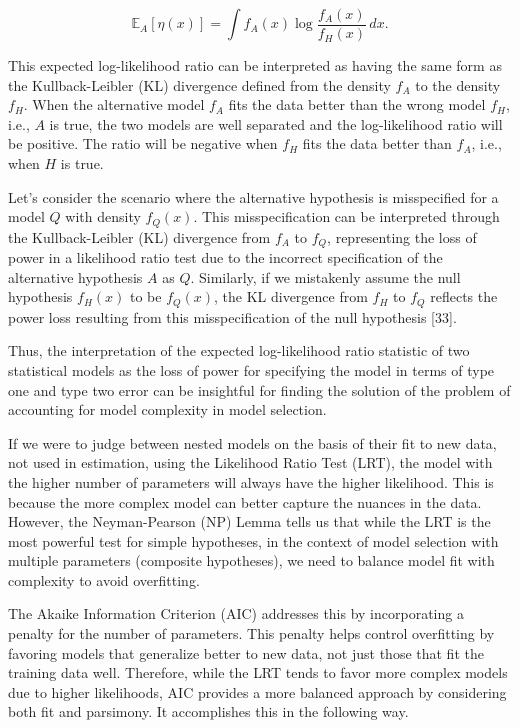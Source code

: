 \documentclass[
11pt, %
oneside, %
english, %
singlespacing, %
]{macthesis} %
\begin{document}
\[
\mathbb{E}_A[\eta(x)]= \int f_A(x) \log \frac{f_A(x)}{f_H(x)} \, dx.
\]

This expected log-likelihood ratio can be interpreted as having the same form as the Kullback-Leibler (KL) divergence defined from the density \(f_A\) to the density \(f_H\). When the alternative model \(f_A\) fits the data better than the wrong model \(f_H\), i.e., \(A\) is true, the two models are well separated and the log-likelihood ratio will be positive. The ratio will be negative when \(f_H\) fits the data better than \(f_A\), i.e., when \(H\) is true.

Let's consider the scenario where the alternative hypothesis is misspecified for a model \(Q\) with density \(f_Q(x)\). This misspecification can be interpreted through the Kullback-Leibler (KL) divergence from \(f_A\) to \(f_Q\), representing the loss of power in a likelihood ratio test due to the incorrect specification of the alternative hypothesis \(A\) as \(Q\). Similarly, if we mistakenly assume the null hypothesis \(f_H(x)\) to be \(f_Q(x)\), the KL divergence from \(f_H\) to \(f_Q\) reflects the power loss resulting from this misspecification of the null hypothesis {[}33{]}.

Thus, the interpretation of the expected log-likelihood ratio statistic of two statistical models as the loss of power for specifying the model in terms of type one and type two error can be insightful for finding the solution of the problem of accounting for model complexity in model selection.

If we were to judge between nested models on the basis of their fit to new data, not used in estimation, using the Likelihood Ratio Test (LRT), the model with the higher number of parameters will always have the higher likelihood. This is because the more complex model can better capture the nuances in the data. However, the Neyman-Pearson (NP) Lemma tells us that while the LRT is the most powerful test for simple hypotheses, in the context of model selection with multiple parameters (composite hypotheses), we need to balance model fit with complexity to avoid overfitting.

The Akaike Information Criterion (AIC) addresses this by incorporating a penalty for the number of parameters. This penalty helps control overfitting by favoring models that generalize better to new data, not just those that fit the training data well. Therefore, while the LRT tends to favor more complex models due to higher likelihoods, AIC provides a more balanced approach by considering both fit and parsimony. It accomplishes this in the following way.
\end{document}
